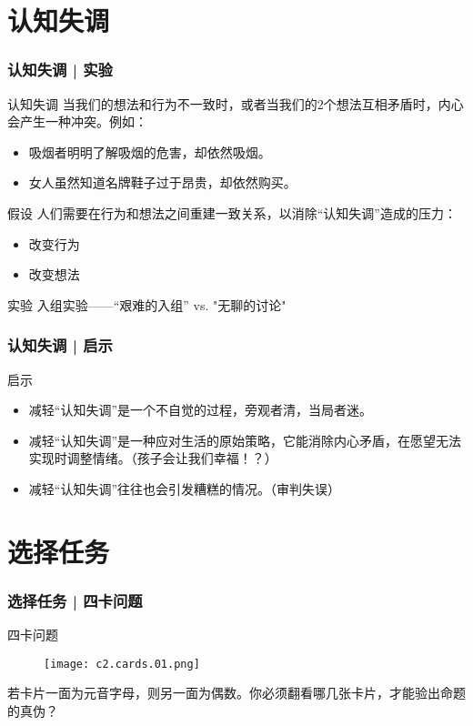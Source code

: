 \section{认知失调}
\begin{frame}
  \frametitle{认知失调 | 实验}
  \begin{block}{认知失调}
    当我们的想法和行为不一致时，或者当我们的2个想法互相矛盾时，内心会产生一种冲突。例如：
    \begin{itemize}
      \item 吸烟者明明了解吸烟的危害，却依然吸烟。
      \item 女人虽然知道名牌鞋子过于昂贵，却依然购买。
    \end{itemize}
  \end{block}
  \pause
  \begin{block}{假设}
    人们需要在行为和想法之间重建一致关系，以消除“认知失调”造成的压力：
    \begin{itemize}
      \item 改变行为
      \item 改变想法
    \end{itemize}
  \end{block}
  \pause
  \begin{block}{实验}
    入组实验——“艰难的入组” vs. "无聊的讨论"
  \end{block}
\end{frame}

\begin{frame}
  \frametitle{认知失调 | 启示}
  \begin{block}{启示}
    \begin{itemize}
      \item 减轻“认知失调”是一个不自觉的过程，旁观者清，当局者迷。
      \item 减轻“认知失调”是一种应对生活的原始策略，它能消除内心矛盾，在愿望无法实现时调整情绪。（孩子会让我们幸福！？）
      \item 减轻“认知失调”往往也会引发糟糕的情况。（审判失误）
    \end{itemize}
  \end{block}
\end{frame}

\section{选择任务}
\begin{frame}
  \frametitle{选择任务 | 四卡问题}
  \begin{block}{四卡问题}
    \begin{figure}
      \centering
      \texttt{[image: c2.cards.01.png]}
    \end{figure}
    若卡片一面为元音字母，则另一面为偶数。你必须翻看哪几张卡片，才能验出命题的真伪？
  \end{block}
\end{frame}

